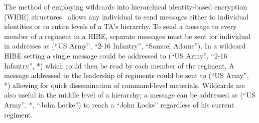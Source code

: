 \documentclass{IEEEtran}
\begin{document}
The method of employing wildcards into hierarchical identity-based
encryption (WIBE) structures~\cite{Abdalla06} allows any individual
to send messages either to individual identities or to entire levels
of a TA's hierarchy. To send a message to every member of a regiment
in a HIBE, separate messages must be sent for individual in
addresses as (``US Army'', ``2-16 Infantry'', ``Samuel Adams''). In
a wildcard HIBE setting a single message could be addressed to (``US
Army'', ``2-16 Infantry'', *) which could then be read by each
member of the regiment. A message addressed to the leadership of
regiments could be sent to (``US Army'', *) allowing for quick
dissemination of command-level materials. Wildcards are also useful
in the middle level of a hierarchy; a message can be addressed as
(``US Army'', *, ``John Locke'') to reach a ``John Locke''
regardless of his current regiment.

\end{document}
